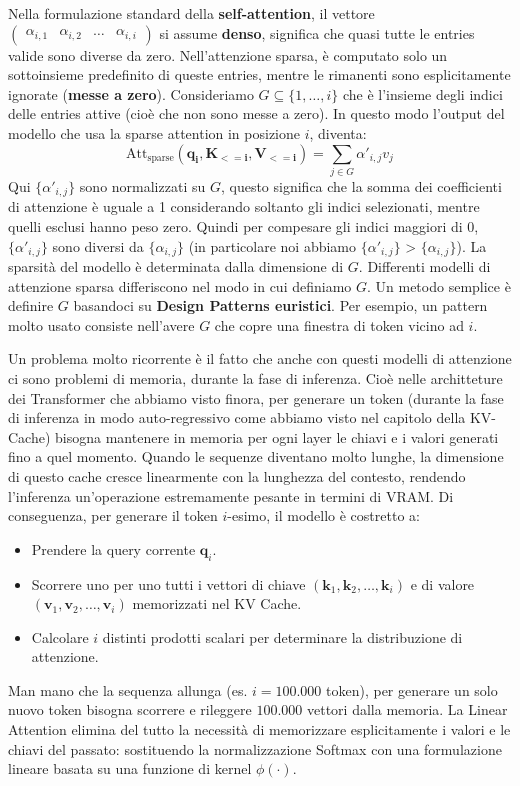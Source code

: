 Nella formulazione standard della \textbf{self-attention}, il vettore $\begin{pmatrix} \alpha_{i,1} & \alpha_{i,2} & \dots & \alpha_{i,i} \end{pmatrix}$ si assume \textbf{denso}, significa che quasi tutte le entries valide sono diverse da zero.
Nell'attenzione sparsa, è computato solo un sottoinsieme predefinito di queste entries, mentre le rimanenti sono esplicitamente ignorate (\textbf{messe a zero}). Consideriamo $G \subseteq \{1,\dots,i\}$ che è l'insieme degli indici delle entries attive (cioè che non sono messe a zero).
In questo modo l'output del modello che usa la sparse attention in posizione $i$, diventa:
\begin{equation}
    \text{Att}_{\text{sparse}}(\mathbf{q_i}, \mathbf{K_{<=i}}, \mathbf{V_{<=i}}) = \sum_{j \in G} \alpha'_{i,j} v_j
\end{equation}
Qui $\{\alpha'_{i,j}\}$ sono normalizzati su $G$, questo significa che la somma dei coefficienti di attenzione è uguale a 1 considerando soltanto gli indici selezionati, mentre quelli esclusi hanno peso zero.
Quindi per compesare gli indici maggiori di 0, $\{\alpha'_{i,j}\}$ sono diversi da $\{\alpha_{i,j}\}$ (in particolare noi abbiamo $\{\alpha'_{i,j}\}$ > $\{\alpha_{i,j}\}$).
La sparsità del modello è determinata dalla dimensione di $G$.
Differenti modelli di attenzione sparsa differiscono nel modo in cui definiamo $G$.
Un metodo semplice è definire $G$ basandoci su \textbf{Design Patterns euristici}.
Per esempio, un pattern molto usato consiste nell'avere $G$ che copre una finestra di token vicino ad $i$.


Un problema molto ricorrente è il fatto che anche con questi modelli di attenzione ci sono problemi di memoria, durante la fase di inferenza.
Cioè nelle architteture dei Transformer che abbiamo visto finora, per generare un token (durante la fase di inferenza in modo auto-regressivo come abbiamo visto nel capitolo della KV-Cache) bisogna mantenere in memoria per ogni layer le chiavi e i valori generati fino a quel momento.
Quando le sequenze diventano molto lunghe, la dimensione di questo cache cresce linearmente con la lunghezza del contesto, rendendo l'inferenza un'operazione estremamente pesante in termini di VRAM.
Di conseguenza, per generare il token $i$-esimo, il modello è costretto a:
\begin{itemize}
    \item Prendere la query corrente $\mathbf{q}_i$.
    \item Scorrere uno per uno tutti i vettori di chiave $(\mathbf{k}_1, \mathbf{k}_2, \dots, \mathbf{k}_i)$ e di valore $(\mathbf{v}_1, \mathbf{v}_2, \dots, \mathbf{v}_i)$ memorizzati nel KV Cache.
    \item Calcolare $i$ distinti prodotti scalari per determinare la distribuzione di attenzione.
\end{itemize}
Man mano che la sequenza allunga (es. $i = 100.000$ token), per generare un solo nuovo token bisogna scorrere e rileggere $100.000$ vettori dalla memoria.
La Linear Attention elimina del tutto la necessità di memorizzare esplicitamente i valori e le chiavi del passato:
sostituendo la normalizzazione Softmax con una formulazione lineare basata su una funzione di kernel $\phi(\cdot)$.

